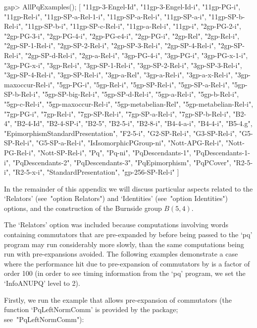 \beginexample
gap> AllPqExamples();
[ "11gp-3-Engel-Id", "11gp-3-Engel-Id-i", "11gp-PG-i", "11gp-Rel-i", 
  "11gp-SP-a-Rel-1-i", "11gp-SP-a-Rel-i", "11gp-SP-a-i", "11gp-SP-b-Rel-i", 
  "11gp-SP-b-i", "11gp-SP-c-Rel-i", "11gp-a-Rel-i", "11gp-i", "2gp-PG-2-i", 
  "2gp-PG-3-i", "2gp-PG-4-i", "2gp-PG-e4-i", "2gp-PG-i", "2gp-Rel", 
  "2gp-Rel-i", "2gp-SP-1-Rel-i", "2gp-SP-2-Rel-i", "2gp-SP-3-Rel-i", 
  "2gp-SP-4-Rel-i", "2gp-SP-Rel-i", "2gp-SP-d-Rel-i", "2gp-a-Rel-i", 
  "3gp-PG-4-i", "3gp-PG-i", "3gp-PG-x-1-i", "3gp-PG-x-i", "3gp-Rel-i", 
  "3gp-SP-1-Rel-i", "3gp-SP-2-Rel-i", "3gp-SP-3-Rel-i", "3gp-SP-4-Rel-i", 
  "3gp-SP-Rel-i", "3gp-a-Rel", "3gp-a-Rel-i", "3gp-a-x-Rel-i", 
  "3gp-maxoccur-Rel-i", "5gp-PG-i", "5gp-Rel-i", "5gp-SP-Rel-i", 
  "5gp-SP-a-Rel-i", "5gp-SP-b-Rel-i", "5gp-SP-big-Rel-i", "5gp-SP-d-Rel-i", 
  "5gp-a-Rel-i", "5gp-b-Rel-i", "5gp-c-Rel-i", "5gp-maxoccur-Rel-i", 
  "5gp-metabelian-Rel", "5gp-metabelian-Rel-i", "7gp-PG-i", "7gp-Rel-i", 
  "7gp-SP-Rel-i", "7gp-SP-a-Rel-i", "7gp-SP-b-Rel-i", "B2-4", "B2-4-Id", 
  "B2-4-SP-i", "B2-5", "B2-5-i", "B2-8-i", "B4-4-a-i", "B4-4-i", "B5-4.g", 
  "EpimorphismStandardPresentation", "F2-5-i", "G2-SP-Rel-i", "G3-SP-Rel-i", 
  "G5-SP-Rel-i", "G5-SP-a-Rel-i", "IsIsomorphicPGroup-ni", "Nott-APG-Rel-i", 
  "Nott-PG-Rel-i", "Nott-SP-Rel-i", "Pq", "Pq-ni", "PqDescendants-1", 
  "PqDescendants-1-i", "PqDescendants-2", "PqDescendants-3", "PqEpimorphism", 
  "PqPCover", "R2-5-i", "R2-5-x-i", "StandardPresentation", "gp-256-SP-Rel-i" 
 ]
\endexample

In the remainder of this appendix  we  will  discuss  particular  aspects
related  to  the  `Relators'  (see~"option  Relators")  and  `Identities'
(see~"option Identities") options, and the construction of  the  Burnside
group $B(5, 4)$.


The `Relators' option was included because computations  involving  words
containing commutators that  are  pre-expanded  by  {\GAP}  before  being
passed to the `pq' program may run considerably  more  slowly,  than  the
same computations being  run  with  {\GAP}  pre-expansions  avoided.  The
following examples demonstrate a case where the performance  hit  due  to
pre-expansion of commutators by {\GAP} is a factor of order 100 (in order
to see timing information from the `pq' program, we set  the  `InfoANUPQ'
level to 2).

Firstly, we run the example that allows pre-expansion of commutators (the
function  `PqLeftNormComm'  is  provided   by   the   {\ANUPQ}   package;
see~"PqLeftNormComm"):

